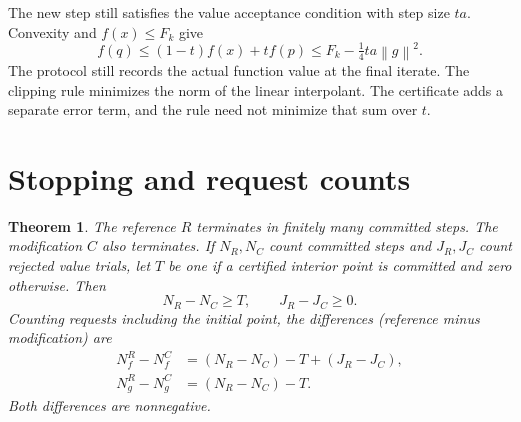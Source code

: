 \documentclass[11pt]{article}
\newtheorem{theorem}{Theorem}
\newcommand{\norm}[1]{\left\lVert#1\right\rVert}
\begin{document}
The new step still satisfies the value acceptance condition with step
size \(ta\). Convexity and \(f(x)\le F_k\) give
\[
 f(q)\le (1-t)f(x)+t f(p)
       \le F_k-\tfrac14 ta\norm{g}^2.
\]
The protocol still records the actual function value at the final
iterate. The clipping rule minimizes the norm of the
linear interpolant. The certificate adds a separate error term, and
the rule need not minimize that sum over \(t\).

\section{Stopping and request counts}

\begin{theorem}\label{thm:counts}
The reference \(R\) terminates in finitely many committed steps.
The modification \(C\) also terminates. If \(N_R,N_C\) count
committed steps and \(J_R,J_C\) count rejected value trials, let
\(T\) be one if a certified interior point is committed and zero
otherwise. Then
\[
 N_R-N_C\ge T,\qquad J_R-J_C\ge0 .
\]
Counting requests including the initial point, the differences
(reference minus modification) are
\begin{align}
 N_f^R-N_f^C&=(N_R-N_C)-T+(J_R-J_C), \label{eq:countf}\\
 N_g^R-N_g^C&=(N_R-N_C)-T. \label{eq:countg}
\end{align}
Both differences are nonnegative.
\end{theorem}
\end{document}
